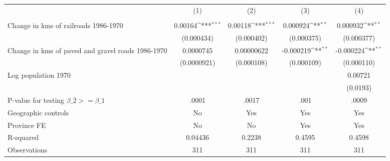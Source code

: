 {
\def\sym#1{\ifmmode^{#1}\else\(^{#1}\)\fi}
\begin{tabular}{l*{4}{c}}
\hline\hline
                &\multicolumn{1}{c}{(1)}&\multicolumn{1}{c}{(2)}&\multicolumn{1}{c}{(3)}&\multicolumn{1}{c}{(4)}\\
                &\multicolumn{1}{c}{}&\multicolumn{1}{c}{}&\multicolumn{1}{c}{}&\multicolumn{1}{c}{}\\
\hline
Change in kms of railroads 1986-1970&  0.00164\sym{***}&  0.00118\sym{***}& 0.000924\sym{**} & 0.000932\sym{**} \\
                &(0.000434)         &(0.000402)         &(0.000375)         &(0.000377)         \\
[1em]
Change in kms of paved and gravel roads 1986-1970&0.0000745         &0.00000622         &-0.000219\sym{**} &-0.000224\sym{**} \\
                &(0.0000921)         &(0.000108)         &(0.000109)         &(0.000110)         \\
[1em]
Log population 1970&                  &                  &                  &  0.00721         \\
                &                  &                  &                  & (0.0193)         \\
\hline
P-value for testing $\beta\_{2} >= \beta\_{1}$&    .0001         &    .0017         &     .001         &    .0009         \\
Geographic controls&       No         &      Yes         &      Yes         &      Yes         \\
Province FE     &       No         &       No         &      Yes         &      Yes         \\
R-squared       &  0.04436         &   0.2238         &   0.4595         &   0.4598         \\
Observations    &      311         &      311         &      311         &      311         \\
\hline\hline
\end{tabular}
}
